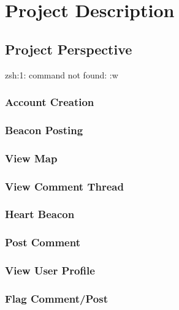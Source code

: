 \section{Project Description}

    \subsection{Project Perspective}
zsh:1: command not found: :w
        \subsubsection{Account Creation}
        \subsubsection{Beacon Posting}
        \subsubsection{View Map}
        \subsubsection{View Comment Thread}
        \subsubsection{Heart Beacon}
        \subsubsection{Post Comment}
        \subsubsection{View User Profile}
        \subsubsection{Flag Comment/Post}

